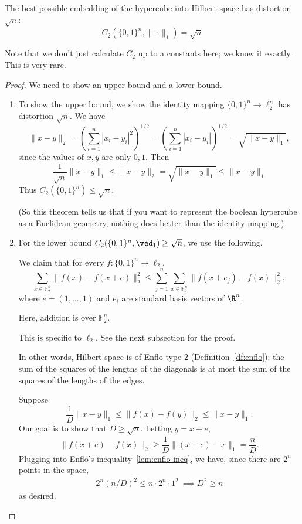 \begin{thm}[Enflo, $1969$]
The best possible embedding of the hypercube into Hilbert space has distortion $\sqrt{n}$: 
\[
C_2(\{0, 1\}^n, \| \cdot \|_1) = \sqrt{n}
\]
\end{thm}
Note that we don't just calculate $C_2$ up to a constants here; we know it exactly. This is very rare. 
\begin{proof}
We need to show an upper bound and a lower bound. 
\begin{enumerate}
\item
To show the upper bound, we show the identity mapping $\{0, 1\}^n \to \ell_2^n$  has distortion $\sqrt n$. %
We have
\[\|x - y\|_2 = \left(\sum_{i = 1}^n |x_i - y_i|^2 \right)^{1/2} = \left(\sum_{i = 1}^n |x_i - y_i| \right)^{1/2} = \sqrt{\|x - y\|_1},\] 
since the values of $x, y$ are only $0, 1$. Then
\[
\frac{1}{\sqrt{n}} \|x - y\|_1 \leq \|x - y\|_2 = \sqrt{\|x - y\|_1} \leq \|x - y\|_1
\]
Thus $C_2(\{0, 1\}^n) \leq \sqrt{n}$. 

(So this theorem tells us that if you want to represent the boolean hypercube as a Euclidean geometry, nothing does better than the identity mapping.)
\item
For the lower bound $C_2(\{0,1\}^n,\ved_1)\ge\sqrt n$, we use the following.
\begin{lem}\label{lem:enflo-ineq}
We claim that for every $f: \{0, 1\}^n \to \ell_2$, $$\sum_{x \in \mathbb{F}_2^n}\|f(x) - f(x + e)\|_2^2 \leq \sum_{j = 1}^n \sum_{x \in \mathbb{F}_2^n} \|f(x + e_j) - f(x)\|_2^2,$$ where $e = (1, \ldots, 1)$ and $e_i$ are standard basis vectors of $\R^n$. 

Here, addition is over $\mathbb{F}_2^n$. 
\end{lem}
This is specific to $\ell_2$. See the next subsection for the proof.

In other words, Hilbert space is of Enflo-type $2$ (Definition~\ref{df:enflo}): the sum of the squares of the lengths of the diagonals is at most the sum of the squares of the lengths of the edges. 

Suppose $$\frac{1}{D}\|x - y\|_1 \leq \|f(x) - f(y)\|_2 \leq \|x - y\|_1.$$ Our goal is to show that $D \geq \sqrt{n}$. 
Letting $y=x+e$,
\[\|f(x + e) - f(x)\|_2 \geq \frac{1}{D}\|(x + e) - x\|_1 = \frac{n}{D}.\] 
Plugging into Enflo's inequality~\ref{lem:enflo-ineq}, we have, since there are $2^n$ points in the space,
\begin{align*}
2^n(n/D)^2 \leq n\cdot 2^n \cdot 1^2\
\implies D^2 \geq n
\end{align*}
as desired.
\end{enumerate}
\end{proof}


